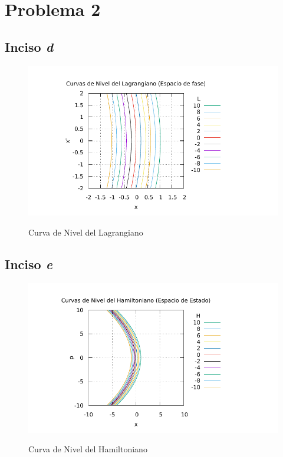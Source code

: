 

\section{Problema 2}
\subsection{Inciso \textit{d}}

\begin{figure}[H]
	\centering
	\includegraphics[scale=1.05]{problema2d.pdf}
	\label{2d}
	\caption{Curva de Nivel del Lagrangiano}
\end{figure}



\subsection{Inciso \textit{e}}

\begin{figure}[H]
	\centering
	\includegraphics[scale=1.05]{problema2e.pdf}
	\label{2d}
	\caption{Curva de Nivel del Hamiltoniano}
\end{figure}









